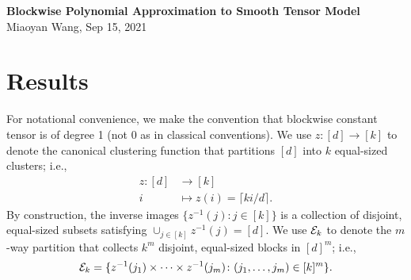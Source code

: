 \documentclass[11pt]{article}
\theoremstyle{definition}
\begin{document}
\begin{center}
{\bf \large Blockwise Polynomial Approximation to Smooth Tensor Model}\\
Miaoyan Wang, Sep 15, 2021\\
\end{center}


\section{Results}
For notational convenience, we make the convention that blockwise constant tensor is of degree 1 (not 0 as in classical conventions). We use $z\colon[d]\to[k]$ to denote the canonical clustering function that partitions $[d]$ into $k$ equal-sized clusters; i.e.,
\begin{align}
z\colon[d]&\to[k] \\
i&\mapsto z(i)=\lceil ki/d\rceil.
\end{align}
By construction, the inverse images $\{z^{-1}(j)\colon j\in[k]\}$ is a collection of disjoint, equal-sized subsets satisfying $\cup_{j\in[k]} z^{-1}(j)=[d]$. We use $\mathcal{E}_k$ to denote the $m$-way partition that collects $k^m$ disjoint, equal-sized blocks in $[d]^m$; i.e.,
\[
\mathcal{E}_k= \{z^{-1}(j_1) \times \cdots \times z^{-1}(j_m)\colon (j_1,\ldots,j_m)\in[k]^m\}. 
\]
\end{document}
